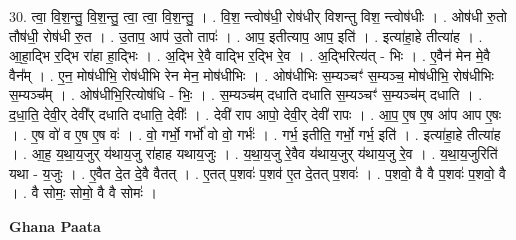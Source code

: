 \documentclass[17pt]{extarticle}
\begin{document}
30. त्वा॒ वि॒श॒न्तु॒ वि॒श॒न्तु॒ त्वा॒ त्वा॒ वि॒श॒न्तु॒ । . वि॒श॒ न्त्वोष॑धी॒ रोष॑धीर् विशन्तु विश॒ न्त्वोष॑धीः । . ओष॑धी रु॒तो तौष॑धी॒ रोष॑धी रु॒त । . उ॒ताप॒ आप॑ उ॒तो तापः॑ । . आप॒ इतीत्याप॒ आप॒ इति॑ । . इत्या॑हा॒हे तीत्या॑ह । . आ॒हा॒द्भि र॒द्भि रा॑हा हा॒द्भिः । . अ॒द्भि रे॒वै वाद्भि र॒द्भि रे॒व । . अ॒द्भिरित्य॑त् - भिः । . ए॒वैन॑ मेन मे॒वै वैन᳚म् । . ए॒न॒ मोष॑धीभि॒ रोष॑धीभि रेन मेन॒ मोष॑धीभिः । . ओष॑धीभिः स॒म्यञ्चꣳ॑ स॒म्यञ्च॒ मोष॑धीभि॒ रोष॑धीभिः स॒म्यञ्च᳚म् । . ओष॑धीभि॒रित्योष॑धि - भिः॒ । . स॒म्यञ्च॑म् दधाति दधाति स॒म्यञ्चꣳ॑ स॒म्यञ्च॑म् दधाति । . द॒धा॒ति॒ देवी॒र् देवी᳚र् दधाति दधाति॒ देवीः᳚ । . देवी॑ राप आपो॒ देवी॒र् देवी॑ रापः । . आ॒प॒ ए॒ष ए॒ष आ॑प आप ए॒षः । . ए॒ष वो॑ व ए॒ष ए॒ष वः॑ । . वो॒ गर्भो॒ गर्भो॑ वो वो॒ गर्भः॑ । . गर्भ॒ इतीति॒ गर्भो॒ गर्भ॒ इति॑ । . इत्या॑हा॒हे तीत्या॑ह । . आ॒ह॒ य॒था॒य॒जुर् य॑थाय॒जु रा॑हाह यथाय॒जुः । . य॒था॒य॒जु रे॒वैव य॑थाय॒जुर् य॑थाय॒जु रे॒व । . य॒था॒य॒जुरिति॑ यथा - य॒जुः । . ए॒वैत दे॒त दे॒वै वैतत् । . ए॒तत् प॒शवः॑ प॒शव॑ ए॒त दे॒तत् प॒शवः॑ । . प॒शवो॒ वै वै प॒शवः॑ प॒शवो॒ वै । . वै सोमः॒ सोमो॒ वै वै सोमः॑ । \newline

\textbf{Ghana Paata } \newline
\end{document}
